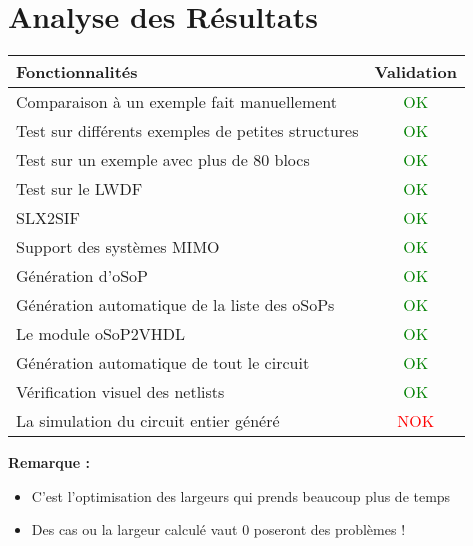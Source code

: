 \section{Analyse des Résultats}
\hspace*{2cm}
\frame{\tableofcontents[currentsection]}
\begin{frame} 
\begin{table}
\begin{tabular}{l | c }
\textbf{Fonctionnalités} & \textbf{Validation} \\
\hline
Comparaison à un exemple fait manuellement & \textcolor{green}{OK} \\
Test sur différents exemples de petites structures & \textcolor{green}{OK} \\
Test sur un exemple avec plus de 80 blocs & \textcolor{green}{OK} \\
Test sur le LWDF & \textcolor{green}{OK} \\
SLX2SIF & \textcolor{green}{OK}\\
Support des systèmes MIMO & \textcolor{green}{OK} \\
Génération d'oSoP & \textcolor{green}{OK} \\
Génération automatique de la liste des oSoPs & \textcolor{green}{OK} \\
Le module oSoP2VHDL & \textcolor{green}{OK} \\
Génération automatique de tout le circuit & \textcolor{green}{OK} \\
Vérification visuel des netlists & \textcolor{green}{OK} \\
La simulation du circuit entier généré & \textcolor{red}{NOK} \\
\end{tabular}
\end{table}

\textbf{Remarque :}
	\begin{itemize}
	\item C'est l'optimisation des largeurs qui prends beaucoup plus de temps
	\item Des cas ou la largeur calculé vaut 0 poseront des problèmes !
	\end{itemize}
	
\end{frame}

\begin{frame} 
	\begin{center}
	\end{center}
\end{frame}